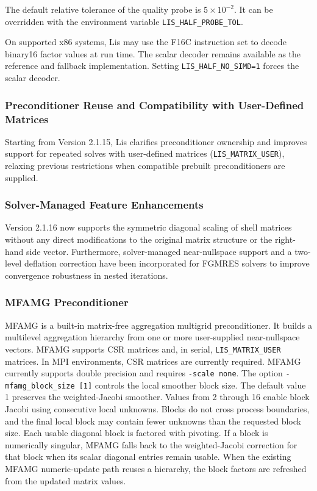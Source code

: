 \documentclass[a4paper]{article}
\begin{document}
The default relative tolerance of the quality probe is $5\times10^{-2}$.
It can be overridden with the environment variable
\verb|LIS_HALF_PROBE_TOL|.

On supported x86 systems, Lis may use the F16C instruction set to decode
binary16 factor values at run time. The scalar decoder remains available
as the reference and fallback implementation. Setting
\verb|LIS_HALF_NO_SIMD=1| forces the scalar decoder.

\subsubsection{Preconditioner Reuse and Compatibility with User-Defined Matrices}
Starting from Version 2.1.15, Lis clarifies preconditioner ownership and improves support for repeated solves with user-defined matrices (\texttt{LIS\_MATRIX\_USER}), relaxing previous restrictions when compatible prebuilt preconditioners are supplied.

\subsubsection{Solver-Managed Feature Enhancements}
Version 2.1.16 now supports the symmetric diagonal scaling of shell matrices without any direct modifications to the original matrix structure or the right-hand side vector. Furthermore, solver-managed near-nullspace support and a two-level deflation correction have been incorporated for FGMRES solvers to improve convergence robustness in nested iterations. 

\subsubsection{MFAMG Preconditioner}
MFAMG is a built-in matrix-free aggregation multigrid preconditioner.
It builds a multilevel aggregation hierarchy from one or more
user-supplied near-nullspace vectors.
MFAMG supports CSR matrices and, in serial,
{\tt LIS\_MATRIX\_USER} matrices. In MPI environments, CSR matrices
are currently required. MFAMG currently supports double precision and
requires \verb=-scale none=.
The option \verb=-mfamg_block_size [1]= controls the local smoother
block size. The default value 1 preserves the weighted-Jacobi smoother.
Values from 2 through 16 enable block Jacobi using consecutive local
unknowns. Blocks do not cross process boundaries, and the final local
block may contain fewer unknowns than the requested block size.
Each usable diagonal block is factored with pivoting. If a block is
numerically singular, MFAMG falls back to the weighted-Jacobi correction
for that block when its scalar diagonal entries remain usable.
When the existing MFAMG numeric-update path reuses a hierarchy, the
block factors are refreshed from the updated matrix values.
\end{document}
